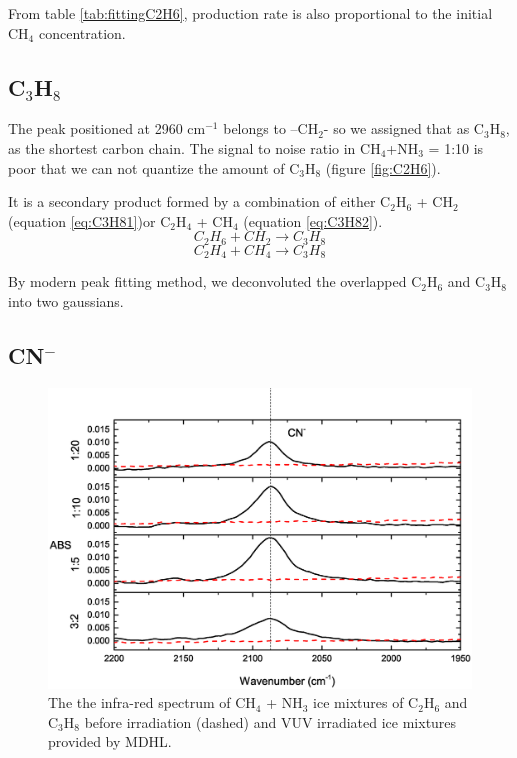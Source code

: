 From table \ref{tab:fittingC2H6}, production rate is also proportional to the initial CH$_4$ concentration.


\subsection{C$_3$H$_8$}

The peak positioned at 2960 cm$^{-1}$ belongs to –CH$_2$- so we assigned that as C$_3$H$_8$, as the shortest carbon chain. The signal to noise ratio in CH$_4$+NH$_3$ = 1:10 is poor that we can not quantize the amount of C$_3$H$_8$ (figure \ref{fig:C2H6}).

It is a secondary product formed by a combination of either C$_2$H$_6$ + CH$_2$ (equation \ref{eq:C3H81})or C$_2$H$_4$ + CH$_4$ (equation \ref{eq:C3H82}).
\begin{equation}
C_2H_6 + CH_2 \rightarrow C_3H_8
\label{eq:C3H81}
\end{equation}
\begin{equation}
C_2H_4 + CH_4 \rightarrow C_3H_8
\label{eq:C3H82}
\end{equation}

By modern peak fitting method, we deconvoluted the overlapped C$_2$H$_6$ and C$_3$H$_8$ into two gaussians.

\subsection{CN$^-$}

\begin{figure}
\centering
\includegraphics[width=\textwidth]{figures/chapter3/CN.eps}
\caption{The the infra-red spectrum of CH$_4$ + NH$_3$ ice mixtures of C$_2$H$_6$ and C$_3$H$_8$ before irradiation (dashed) and VUV irradiated ice mixtures provided by MDHL. }
\label{fig:CN}
\end{figure}

